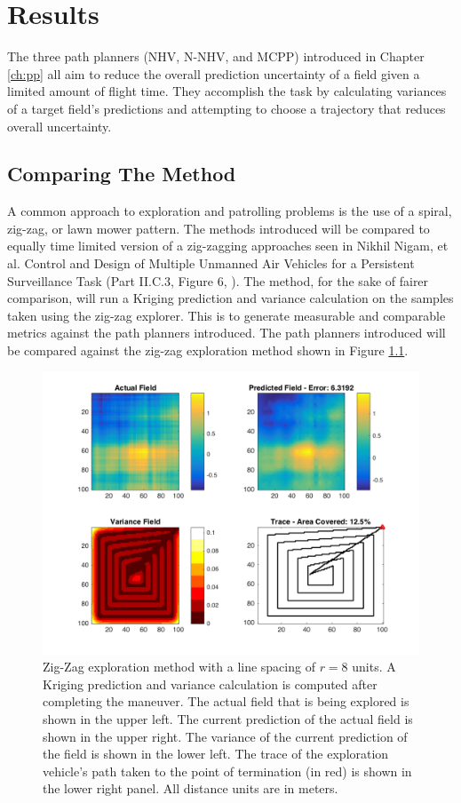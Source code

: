 \chapter{Results}
The three path planners (NHV, N-NHV, and MCPP) introduced in Chapter \ref{ch:pp} all aim to reduce the overall prediction uncertainty of a field given a limited amount of flight time. They accomplish the task by calculating variances of a target field's predictions and attempting to choose a trajectory that reduces overall uncertainty. 

\section{Comparing The Method}
A common approach to exploration and patrolling problems is the use of a spiral, zig-zag, or lawn mower pattern. The methods introduced will be compared to equally time limited version of a zig-zagging approaches seen in Nikhil Nigam, et al. Control and Design of Multiple Unmanned Air Vehicles for a Persistent Surveillance Task (Part II.C.3, Figure 6, \cite{nigam:zigzag}). The method, for the sake of fairer comparison, will run a Kriging prediction and variance calculation on the samples taken using the zig-zag explorer. This is to generate measurable and comparable metrics against the path planners introduced. The path planners introduced will be compared against the zig-zag exploration method shown in Figure \ref{fig:zigzag4}.

\begin{figure}[hbt!]
	\centering
	\includegraphics[width=0.9\linewidth]{figures/zigzag_4panel.png}
	\captionsetup{skip=0.20\baselineskip,size=footnotesize}
	\caption{Zig-Zag exploration method with a line spacing of $r = 8$ units. A Kriging prediction and variance calculation is computed after completing the maneuver. The actual field that is being explored is shown in the upper left. The current prediction of the actual field is shown in the upper right. The variance of the current prediction of the field is shown in the lower left. The trace of the exploration vehicle's path taken to the point of termination (in red) is shown in the lower right panel. All distance units are in meters.}
	\label{fig:zigzag4}
\end{figure}

